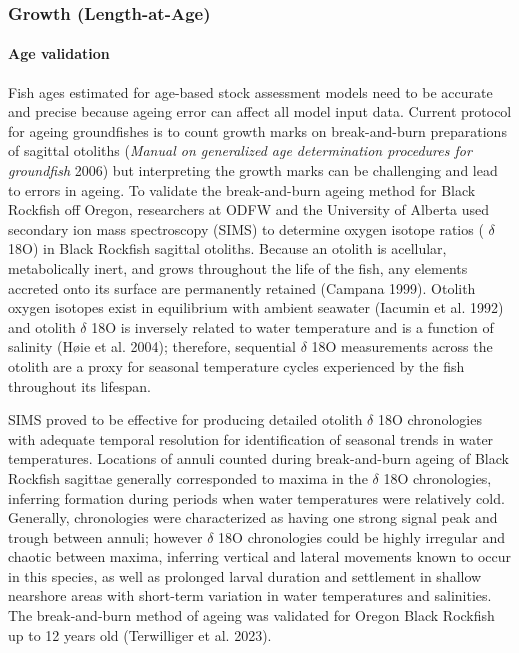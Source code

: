 \documentclass[11pt,
  letterpaper,
]{article}
\begin{document}
\hypertarget{growth-length-at-age}{%
\subsubsection{Growth (Length-at-Age)}\label{growth-length-at-age}}

\hypertarget{age-validation}{%
\paragraph{Age validation}\label{age-validation}}

Fish ages estimated for age-based stock assessment models need to be accurate and precise because ageing error can affect all model input data. Current protocol for ageing groundfishes is to count growth marks on break-and-burn preparations of sagittal otoliths (\emph{Manual on generalized age determination procedures for groundfish} 2006) but interpreting the growth marks can be challenging and lead to errors in ageing. To validate the break-and-burn ageing method for Black Rockfish off Oregon, researchers at ODFW and the University of Alberta used secondary ion mass spectroscopy (SIMS) to determine oxygen isotope ratios ( \(\delta\) 18O) in Black Rockfish sagittal otoliths. Because an otolith is acellular, metabolically inert, and grows throughout the life of the fish, any elements accreted onto its surface are permanently retained (Campana 1999). Otolith oxygen isotopes exist in equilibrium with ambient seawater (Iacumin et al. 1992) and otolith \(\delta\) 18O is inversely related to water temperature and is a function of salinity (Høie et al. 2004); therefore, sequential \(\delta\) 18O measurements across the otolith are a proxy for seasonal temperature cycles experienced by the fish throughout its lifespan.

SIMS proved to be effective for producing detailed otolith \(\delta\) 18O chronologies with adequate temporal resolution for identification of seasonal trends in water temperatures. Locations of annuli counted during break-and-burn ageing of Black Rockfish sagittae generally corresponded to maxima in the \(\delta\) 18O chronologies, inferring formation during periods when water temperatures were relatively cold. Generally, chronologies were characterized as having one strong signal peak and trough between annuli; however \(\delta\) 18O chronologies could be highly irregular and chaotic between maxima, inferring vertical and lateral movements known to occur in this species, as well as prolonged larval duration and settlement in shallow nearshore areas with short-term variation in water temperatures and salinities. The break-and-burn method of ageing was validated for Oregon Black Rockfish up to 12 years old (Terwilliger et al. 2023).
\end{document}
